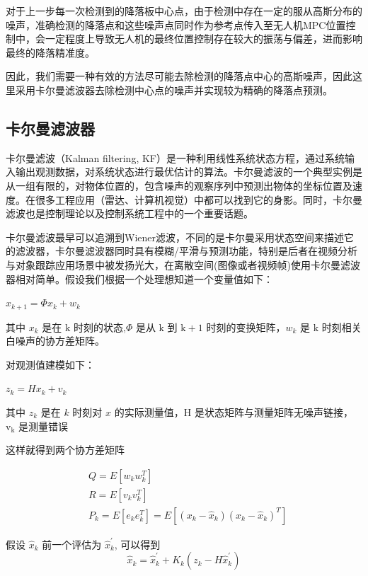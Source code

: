 对于上一步每一次检测到的降落板中心点，由于检测中存在一定的服从高斯分布的噪声，准确检测的降落点和这些噪声点同时作为参考点传入至无人机MPC位置控制中，会一定程度上导致无人机的最终位置控制存在较大的振荡与偏差，进而影响最终的降落精准度。

因此，我们需要一种有效的方法尽可能去除检测的降落点中心的高斯噪声，因此这里采用卡尔曼滤波器去除检测中心点的噪声并实现较为精确的降落点预测。

\subsection{卡尔曼滤波器}

卡尔曼滤波（Kalman filtering, KF）是一种利用线性系统状态方程，通过系统输入输出观测数据，对系统状态进行最优估计的算法。卡尔曼滤波的一个典型实例是从一组有限的，对物体位置的，包含噪声的观察序列中预测出物体的坐标位置及速度。在很多工程应用（雷达、计算机视觉）中都可以找到它的身影。同时，卡尔曼滤波也是控制理论以及控制系统工程中的一个重要话题。

卡尔曼滤波最早可以追溯到Wiener滤波，不同的是卡尔曼采用状态空间来描述它的滤波器，卡尔曼滤波器同时具有模糊/平滑与预测功能，特别是后者在视频分析与对象跟踪应用场景中被发扬光大，在离散空间(图像或者视频帧)使用卡尔曼滤波器相对简单。假设我们根据一个处理想知道一个变量值如下：

$x_{k+1}=\Phi x_{k}+w_{k}$

其中 $x_{k}$ 是在 $\mathrm{k}$ 时刻的状态,$\Phi$ 是从 $\mathrm{k}$ 到 $\mathrm{k}+1$ 时刻的变换矩阵，$w_{k}$ 是 $\mathrm{k}$ 时刻相关白噪声的协方差矩阵。

对观测值建模如下：

$z_{k}=H x_{k}+v_{k}$

其中 $z_{k}$ 是在 $k$ 时刻对 $x$ 的实际测量值，$\mathrm{H}$ 是状态矩阵与测量矩阵无噪声链接，$\mathrm{v}_{\mathrm{k}}$ 是测量错误

这样就得到两个协方差矩阵

$$
\begin{aligned}
&Q=E\left[w_{k} w_{k}^{T}\right] \\
&R=E\left[v_{k} v_{k}^{T}\right] \\
&P_{k}=E\left[e_{k} e_{k}^{T}\right]=E\left[\left(x_{k}-\hat{x}_{k}\right)\left(x_{k}-\hat{x}_{k}\right)^{T}\right]
\end{aligned}
$$

假设 $\hat{x}_{k}$ 前一个评估为 $\hat{x}_{k}^{\prime}$, 可以得到
$$
\hat{x}_{k}=\hat{x}_{k}^{\prime}+K_{k}\left(z_{k}-H \hat{x}_{k}^{\prime}\right)
$$

